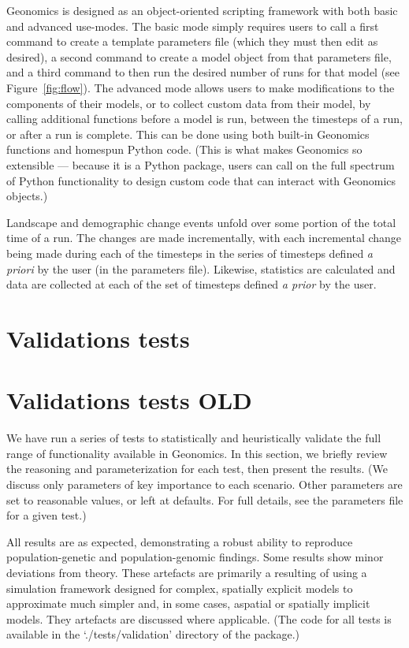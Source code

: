 ﻿\documentclass{article}
\begin{document}
Geonomics is designed as an object-oriented scripting framework with both basic and advanced use-modes.
The basic mode simply requires users to call a first command to create a template
parameters file (which they must then edit as desired), a second command to create
a model object from that parameters file, and a third command to then run the desired number
of runs for that model (see Figure~\ref{fig:flow}).
The advanced mode allows users to make modifications to the components of their models,
or to collect custom data from their model, by calling additional functions
before a model is run, between the timesteps of a run, or after a run is complete.
This can be done using both built-in Geonomics functions and homespun Python code.
(This is what makes Geonomics so extensible --- because it is a Python package, users can call on
the full spectrum of Python functionality to design custom code that can interact with Geonomics objects.)

Landscape and demographic change events unfold over some portion of the total time of a run.
The changes are made incrementally, with each incremental change being made 
during each of the timesteps in the series of timesteps defined \emph{a priori} by the user (in the parameters file).
Likewise, statistics are calculated and data are collected
at each of the set of timesteps defined \emph{a prior} by the user.


\section{Validations tests}

\section{Validations tests OLD}
We have run a series of tests to statistically and heuristically validate
the full range of functionality available in Geonomics.
In this section, we briefly review the reasoning and parameterization for each test,
then present the results.
(We discuss only parameters of key importance to each scenario.
Other parameters are set to reasonable values, or left at defaults.
For full details, see the parameters file for a given test.)

All results are as expected, demonstrating a robust ability to reproduce 
population-genetic and population-genomic findings.
Some results show minor deviations from theory.
These artefacts are primarily a resulting of using a simulation framework
designed for complex, spatially explicit models 
to approximate much simpler and, in some cases, aspatial or spatially implicit models.
They artefacts are discussed where applicable.
(The code for all tests is available in the `./tests/validation' directory of the package.)
\end{document}
